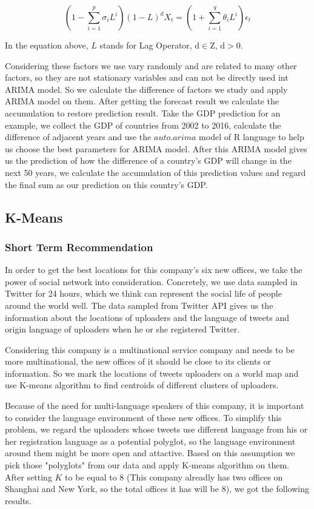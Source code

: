 \documentclass{mcmthesis}
\begin{document}
  \begin{equation}
    \left(1-\sum^p_{i=1}\sigma_i L^i\right)(1-L)^d X_t = \left(1+\sum^q_{i=1}\theta_i L^i\right)\epsilon_t
  \end{equation}

  \indent In the equation above, $L$ stands for Lag Operator, d$\in$Z, d$>$0.

  \indent Considering these factors we use vary randomly and are related to many other factors, so they are not stationary variables and can not be directly used int ARIMA model. So we calculate the difference of factors we study and apply ARIMA model on them. After getting the forecast result we calculate the accumulation to restore prediction result. Take the GDP prediction for an example, we collect the GDP of countries from 2002 to 2016, calculate the difference of adjacent years and use the $auto.arima$ model of R language to help us choose the best parameters for ARIMA model. After this ARIMA model gives us the prediction of how the difference of a country's GDP will change in the next 50 years, we calculate the accumulation of this prediction values and regard the final sum as our prediction on this country's GDP.

  \subsection{K-Means}

  \subsubsection{Short Term Recommendation}

  \indent \indent In order to get the best locations for this company's six new offices, we take the power of social network into consideration. Concretely, we use data sampled in Twitter for 24 hours, which we think can represent the social life of people around the world well. The data sampled from Twitter API gives us the information about the locations of uploaders and the language of tweets and origin language of uploaders when he or she registered Twitter. 

  \indent Considering this company is a multinational service company and needs to be more multinational, the new offices of it should be close to its clients or information. So we mark the locations of tweets uploaders on a world map and use K-means algorithm to find centroids of different clusters of uploaders.
  
  \indent Because of the need for multi-language speakers of this company, it is important to consider the language environment of these new offices. To simplify this problem, we regard the uploaders whose tweets use different language from his or her registration language as a potential polyglot, so the language environment around them might be more open and attactive. Based on this assumption we pick those "polyglots" from our data and apply K-means algorithm on them. After setting $K$ to be equal to 8 (This company alreadly has two offices on Shanghai and New York, so the total offices it has will be 8), we got the following results.
\end{document}
